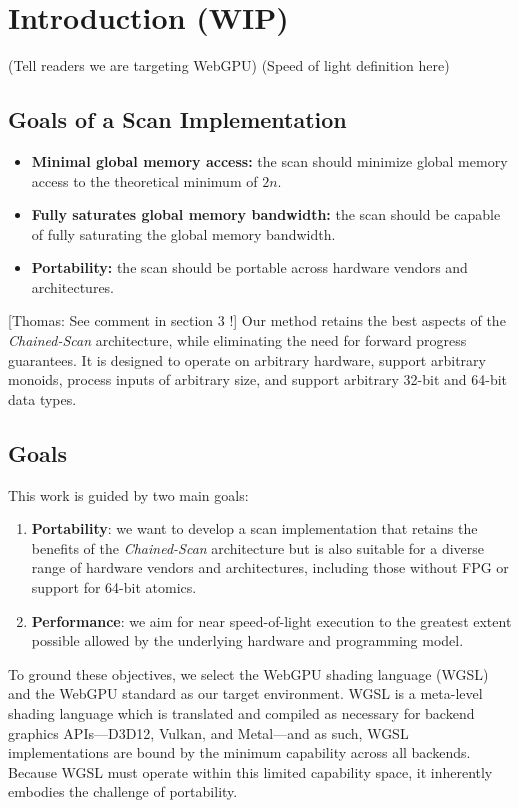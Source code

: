 \documentclass[sigconf]{acmart}
\newcommand{\thomas}[1]{{\footnotesize\color{orange}[Thomas: #1]}}
\begin{document}
\section{Introduction (WIP)}
 (Tell readers we are targeting WebGPU)
 (Speed of light definition here)
\subsection{Goals of a Scan Implementation}
\begin{itemize}
  \item \textbf{Minimal global memory access:} the scan should minimize global memory access to the theoretical minimum of $2n$.
  \item \textbf{Fully saturates global memory bandwidth:} the scan should be capable of fully saturating the global memory bandwidth.
  \item \textbf{Portability:} the scan should be portable across hardware vendors and architectures.
\end{itemize}
\thomas{See comment in section 3 !}
Our method retains the best aspects of the \emph{Chained-Scan} architecture, while eliminating the need for forward progress guarantees. It is designed to operate on arbitrary hardware, support arbitrary monoids, process inputs of arbitrary size, and support arbitrary 32-bit and 64-bit data types.
\subsection{Goals}
This work is guided by two main goals:
\begin{enumerate}
  \item \textbf{Portability}: we want to develop a scan implementation that retains the benefits of the \emph{Chained-Scan} architecture but is also suitable for a diverse range of hardware vendors and architectures, including those without FPG or support for 64-bit atomics.
  \item \textbf{Performance}: we aim for near speed-of-light execution to the greatest extent possible allowed by the underlying hardware and programming model.
\end{enumerate}

\noindent
To ground these objectives, we select the WebGPU shading language (WGSL) and the WebGPU standard as our target environment. WGSL is a meta-level shading language which is translated and compiled as necessary for backend graphics APIs---D3D12, Vulkan, and Metal---and as such, WGSL implementations are bound by the minimum capability across all backends. Because WGSL must operate within this limited capability space, it inherently embodies the challenge of portability.
\end{document}
